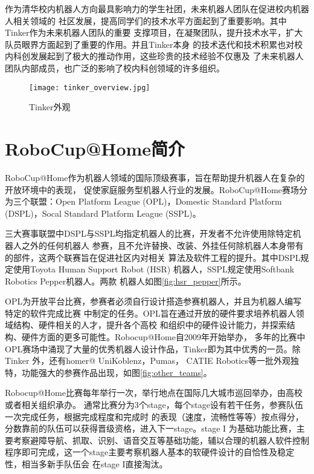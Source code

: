 作为清华校内机器人方向最具影响力的学生社团，未来机器人团队在促进校内机器人相关领域的
社区发展，提高同学们的技术水平方面起到了重要影响。其中Tinker作为未来机器人团队的重要
支撑项目，在凝聚团队，提升技术水平，扩大队员眼界方面起到了重要的作用。并且Tinker本身
的技术迭代和技术积累也对校内科创发展起到了极大的推动作用，这些珍贵的技术经验不仅惠及
了未来机器人团队内部成员，也广泛的影响了校内科创领域的许多组织。

\begin{figure}
  \centering
  \texttt{[image: tinker\_overview.jpg]}
  \caption{Tinker外观}
  \label{fig:tinker_overview}
\end{figure}


\section{RoboCup@Home简介}

RoboCup@Home作为机器人领域的国际顶级赛事，旨在帮助提升机器人在复杂的开放环境中的表现，
促使家庭服务型机器人行业的发展。RoboCup@Home赛场分为三个联盟：Open Platform League
(OPL)，Domestic Standard Platform (DSPL)，Socal Standard Platform League
 (SSPL)。

三大赛事联盟中DSPL与SSPL均指定机器人的比赛，开发者不允许使用除特定机器人之外的任何机器人
参赛，且不允许替换、改装、外挂任何除机器人本身带有的部件，这两个联赛旨在促进社区内对相关
算法及软件工程的提升。其中DSPL规定使用Toyota Human Support Robot (HSR)\cite{toyota_hsr}
机器人，SSPL规定使用Softbank Robotics Pepper\cite{pandey2018mass}机器人。两款
机器人如图\ref{fig:hsr_pepper}所示。


OPL为开放平台比赛，参赛者必须自行设计搭造参赛机器人，并且为机器人编写特定的软件完成比赛
中制定的任务。OPL旨在通过开放的硬件要求培养机器人领域结构、硬件相关的人才，提升各个高校
和组织中的硬件设计能力，并探索结构、硬件方面的更多可能性。Robocup@Home自2009年开始举办，
多年的比赛中OPL赛场中涌现了大量的优秀机器人设计作品，Tinker即为其中优秀的一员。除Tinker
外，还有homer@ UniKoblenz\cite{memmesheimer2017homer}，Pumas\cite{savage2013pumas}，
CATIE Robotics\cite{fabre2018catie}等一批外观独特，功能强大的参赛作品出现，如图\ref{fig:other_teams}。

Robocup@Home比赛每年举行一次，举行地点在国际几大城市巡回举办，由高校或者相关组织承办。
通常比赛分为3个stage，每个stage设有若干任务，参赛队伍一次完成任务，根据完成程度和完成时
的表现（速度，流畅性等等）按点得分，分数靠前的队伍可以获得晋级资格，进入下一stage。stage I
为基础功能比赛，主要考察避障导航、抓取、识别、语音交互等基础功能，辅以合理的机器人软件控制
程序即可完成，这一个stage主要考察机器人基本的软硬件设计的自恰性及稳定性，相当多新手队伍会
在stage I直接淘汰。

